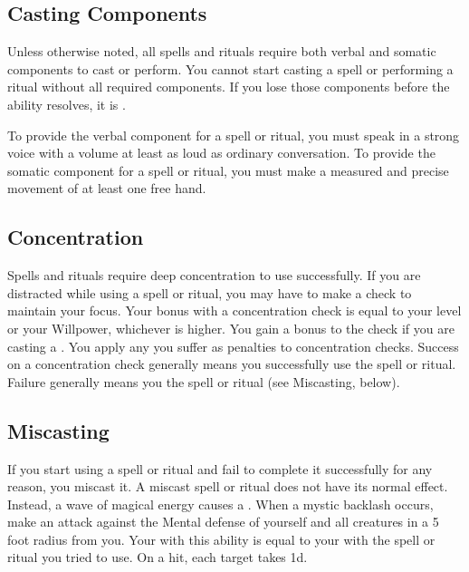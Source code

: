     \subsection{Casting Components}\label{Casting Components}
        Unless otherwise noted, all spells and rituals require both verbal and somatic components to cast or perform.
        You cannot start casting a spell or performing a ritual without all required components.
        If you lose those components before the ability resolves, it is .

        To provide the verbal component for a spell or ritual, you must speak in a strong voice with a volume at least as loud as ordinary conversation.
        To provide the somatic component for a spell or ritual, you must make a measured and precise movement of at least one free hand.

    \subsection{Concentration}\label{Concentration}
        Spells and rituals require deep concentration to use successfully.
        If you are distracted while using a spell or ritual, you may have to make a  check to maintain your focus.
        Your bonus with a concentration check is equal to your level or your Willpower, whichever is higher.
        You gain a  bonus to the check if you are casting a .
        You apply any  you suffer as penalties to concentration checks.
        Success on a concentration check generally means you successfully use the spell or ritual.
        Failure generally means you  the spell or ritual (see Miscasting, below).

    \subsection{Miscasting}\label{Miscasting}

        If you start using a spell or ritual and fail to complete it successfully for any reason, you miscast it.
        A miscast spell or ritual does not have its normal effect.
        Instead, a wave of magical energy causes a .
        When a mystic backlash occurs, make an attack against the Mental defense of yourself and all creatures in a 5 foot radius from you.
        Your  with this ability is equal to your  with the spell or ritual you tried to use.
        On a hit, each target takes  \minus1d.

